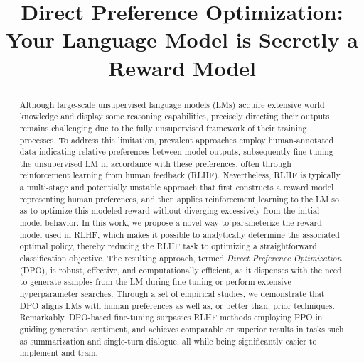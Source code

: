 \title{Direct Preference Optimization: Your Language Model is Secretly a Reward Model}

\begin{abstract}
Although large-scale unsupervised language models (LMs) acquire extensive world knowledge and display some reasoning capabilities, precisely directing their outputs remains challenging due to the fully unsupervised framework of their training processes. To address this limitation, prevalent approaches employ human-annotated data indicating relative preferences between model outputs, subsequently fine-tuning the unsupervised LM in accordance with these preferences, often through reinforcement learning from human feedback (RLHF). Nevertheless, RLHF is typically a multi-stage and potentially unstable approach that first constructs a reward model representing human preferences, and then applies reinforcement learning to the LM so as to optimize this modeled reward without diverging excessively from the initial model behavior. In this work, we propose a novel way to parameterize the reward model used in RLHF, which makes it possible to analytically determine the associated optimal policy, thereby reducing the RLHF task to optimizing a straightforward classification objective. The resulting approach, termed \textit{Direct Preference Optimization} (DPO), is robust, effective, and computationally efficient, as it dispenses with the need to generate samples from the LM during fine-tuning or perform extensive hyperparameter searches. Through a set of empirical studies, we demonstrate that DPO aligns LMs with human preferences as well as, or better than, prior techniques. Remarkably, DPO-based fine-tuning surpasses RLHF methods employing PPO in guiding generation sentiment, and achieves comparable or superior results in tasks such as summarization and single-turn dialogue, all while being significantly easier to implement and train.
\end{abstract}

